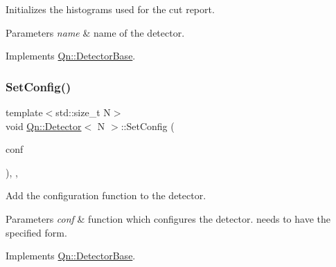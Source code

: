Initializes the histograms used for the cut report. 
\begin{DoxyParams}{Parameters}
{\em name} & name of the detector. \\
\hline
\end{DoxyParams}


Implements \mbox{\hyperlink{classQn_1_1DetectorBase}{Qn\+::\+Detector\+Base}}.

\mbox{\label{classQn_1_1Detector_ac339acf64a05ab762a33137e2f00f84e}} 
\subsubsection{\texorpdfstring{Set\+Config()}{SetConfig()}}
{\footnotesize\ttfamily template$<$std\+::size\+\_\+t N$>$ \\
void \mbox{\hyperlink{classQn_1_1Detector}{Qn\+::\+Detector}}$<$ N $>$\+::Set\+Config (\begin{DoxyParamCaption}\item[{std\+::function$<$ void(\mbox{\hyperlink{classQn_1_1DetectorConfiguration}{Detector\+Configuration}} $\ast$config)$>$}]{conf }\end{DoxyParamCaption})\hspace{0.3cm}{\ttfamily [inline]}, {\ttfamily [override]}, {\ttfamily [virtual]}}



Add the configuration function to the detector. 


\begin{DoxyParams}{Parameters}
{\em conf} & function which configures the detector. needs to have the specified form. \\
\hline
\end{DoxyParams}


Implements \mbox{\hyperlink{classQn_1_1DetectorBase}{Qn\+::\+Detector\+Base}}.

\mbox{\label{classQn_1_1Detector_aaaf2475cd8fa805dbca1fe22b72acdf5}} 
